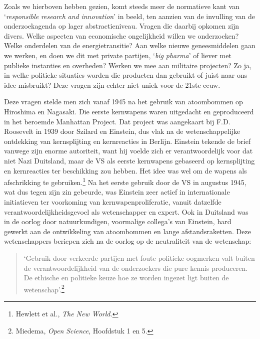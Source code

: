 \documentclass[smallauthor, chapterhaspagenum, nochapterinheader, pagenuminheader,  bigchapnum,medium2, tocpages, garamond, titleinheader]{jote-book}
\begin{document}
	Zoals we hierboven hebben gezien, komt steeds meer de normatieve kant van ‘\emph{responsible}\emph{ research }\emph{and}\emph{ }\emph{innovation}' in beeld, ten aanzien van de invulling van de onderzoekagenda op lager abstractieniveau. Vragen die daarbij opkomen zijn divers. Welke aspecten van economische ongelijkheid willen we onderzoeken? Welke onderdelen van de energietransitie? Aan welke nieuwe geneesmiddelen gaan we werken, en doen we dit met private partijen, ‘\emph{big }\emph{pharma}' of liever met publieke instanties en overheden? Werken we mee aan militaire projecten? Zo ja, in welke politieke situaties worden die producten dan gebruikt of juist naar ons idee misbruikt? Deze vragen zijn echter niet uniek voor de 21ste eeuw.



	Deze vragen stelde men zich vanaf 1945 na het gebruik van atoombommen op Hiroshima en Nagasaki. Die eerste kernwapens waren uitgedacht en geproduceerd in het beroemde Manhattan Project. Dat project was aangekaart bij F.D. Roosevelt in 1939 door Szilard en Einstein, dus vlak na de wetenschappelijke ontdekking van kernsplijting en kernreacties in Berlijn. Einstein tekende de brief vanwege zijn enorme autoriteit, want hij voelde zich er verantwoordelijk voor dat niet Nazi Duitsland, maar de VS als eerste kernwapens gebaseerd op kernsplijting en kernreacties ter beschikking zou hebben. Het idee was wel om de wapens als afschrikking te gebruiken.\footnote{Hewlett et al., \emph{The New World}\emph{.}} Na het eerste gebruik door de VS in augustus 1945, wat dus tegen zijn zin gebeurde, was Einstein zeer actief in internationale initiatieven ter voorkoming van kernwapenproliferatie, vanuit datzelfde verantwoordelijkheidsgevoel als wetenschapper en expert. Ook in Duitsland was in de oorlog door natuurkundigen, voormalige collega's van Einstein, hard gewerkt aan de ontwikkeling van atoombommen en lange afstandsraketten. Deze wetenschappers beriepen zich na de oorlog op de neutraliteit van de wetenschap:

	\begin{quote}
		\itshape

		‘Gebruik door verkeerde partijen met foute politieke oogmerken valt buiten de verantwoordelijkheid van de onderzoekers die pure kennis produceren. De ethische en politieke keuze hoe ze worden ingezet ligt buiten de wetenschap'.\footnote{Miedema, \emph{Open }\emph{Science}, Hoofdstuk 1 en 5.}
	\end{quote}
\end{document}
